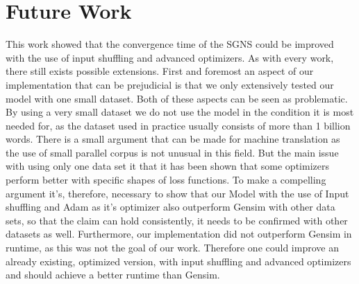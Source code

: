 \section{Future Work}
This work showed that the convergence time of the SGNS could be improved with the use of input shuffling and advanced optimizers. As with every work, there still exists possible extensions. First and foremost an aspect of our implementation that can be prejudicial is that we only extensively tested our model with one small dataset. Both of these aspects can be seen as problematic. By using a very small dataset we do not use the model in the condition it is most needed for, as the dataset used in practice usually consists of more than 1 billion words. There is a small argument that can be made for machine translation as the use of small parallel corpus is not unusual in this field. But the main issue with using only one data set it that it has been shown that some optimizers perform better with specific shapes of loss functions.  To make a compelling argument it's, therefore, necessary to show that our Model with the use of Input shuffling and Adam as it's optimizer also outperform Gensim with other data sets, so that the claim can hold consistently, it needs to be confirmed with other datasets as well.
Furthermore, our implementation did not outperform Gensim in runtime, as this was not the goal of our work. Therefore one could improve an already existing, optimized version, with input shuffling and advanced optimizers and should achieve a better runtime than Gensim.
